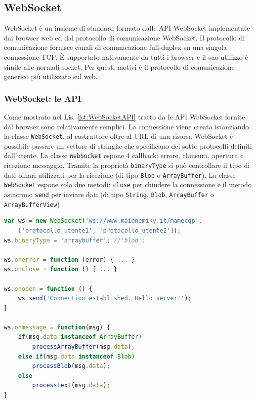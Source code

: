 \subsection{WebSocket}
WebSocket è un insieme di standard formato dalle API WebSocket implementate dai browser web ed dal protocollo di comunicazione WebSocket. Il protocollo di comunicazione fornisce canali di comunicazione full-duplex su una singola connessione TCP. È supportato nativamente da tutti i browser e il suo utilizzo è simile alle normali socket. Per questi motivi è il protocollo di comunicazione generico più utilizzato sul web.

\subsubsection{WebSocket: le API}
Come mostrato nel Lis. \ref{lst:WebSocketAPI} tratto da \parencite{High_Performance_Browser_Networking} le API WebSocket fornite dal browser sono relativamente semplici. La connessione viene creata istanziando la classe \verb|WebSocket|, al costruttore oltre al URL di una risorsa WebSocket è possibile passare un vettore di stringhe che specificano dei sotto-protocolli definiti dall'utente. La classe \verb|WebSocket| espone 4 callback: errore, chiusura, apertura e ricezione messaggio. Tramite la proprietà \verb|binaryType| si può controllare il tipo di dati binari utilizzati per la ricezione (di tipo \verb|Blob| o \verb|ArrayBuffer|). La classe \verb|WebSocket| espone solo due metodi: \verb|close| per chiudere la connessione e il metodo asincrono \verb|send| per inviare dati (di tipo \verb|String|, \verb|Blob|, \verb|ArrayBuffer| o \verb|ArrayBufferView|) \parencite{WebSocket_Web_APIs}.

\begin{lstlisting}[language=JavaScript, caption=Esempio di codice delle API WebSocket, label={lst:WebSocketAPI}]
var ws = new WebSocket('ws://www.maionemiky.it/mamecgp', 
	['protocollo_utente1', 'protocollo_utente2']);
ws.binaryType = 'arraybuffer'; //'blob';

ws.onerror = function (error) { ... } 
ws.onclose = function () { ... } 

ws.onopen = function () { 
	ws.send('Connection established. Hello server!'); 
}

ws.onmessage = function(msg) { 
	if(msg.data instanceof ArrayBuffer)
		processArrayBuffer(msg.data);
	else if(msg.data instanceof Blob)
		processBlob(msg.data);
	else
		processText(msg.data);	
}
\end{lstlisting}

